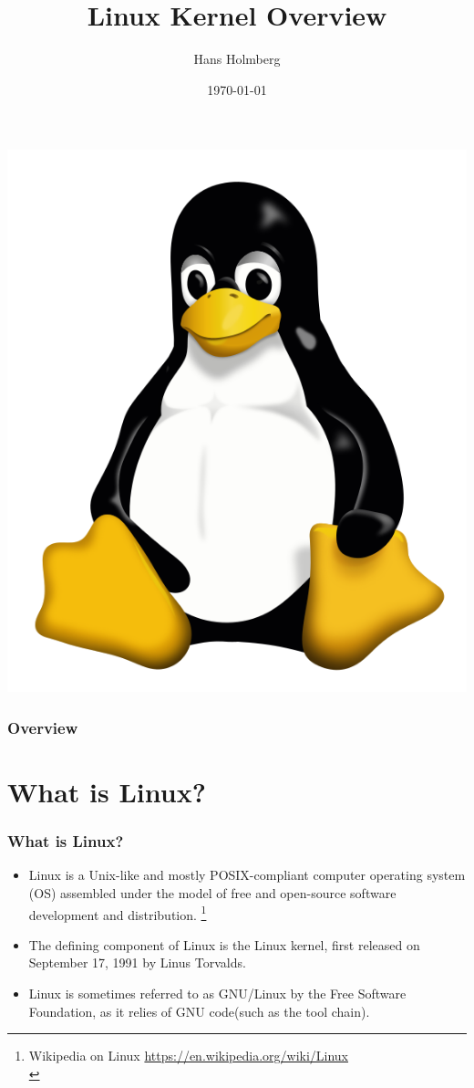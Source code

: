 \documentclass{beamer}
\title[TLKDCC Overview]{Linux Kernel Overview}
\author{Hans Holmberg}
\institute[LKTP]
{
Linux Kernel Teaching Project \\ 
\medskip
\textit{hans.holmberg@gmail.com}
}
\date{\today}
\begin{document}
\begin{frame}
\titlepage
\includegraphics{tux} 
\end{frame}

\begin{frame}
\frametitle{Overview}
\tableofcontents 
\end{frame}

\section{What is Linux?} 

\begin{frame}
\frametitle{What is Linux?}
\begin{itemize}
	\item Linux is a Unix-like and mostly POSIX-compliant computer operating system (OS) assembled under the model of free and open-source software development and distribution. \footnote{Wikipedia on Linux \url{https://en.wikipedia.org/wiki/Linux}\\}
	\item The defining component of Linux is the Linux kernel, first released on September 17, 1991 by Linus Torvalds.
	\item Linux is sometimes referred to as GNU/Linux by the Free Software Foundation, as it relies of GNU code(such as the tool chain).
\end{itemize}
\end{frame}
\end{document}
